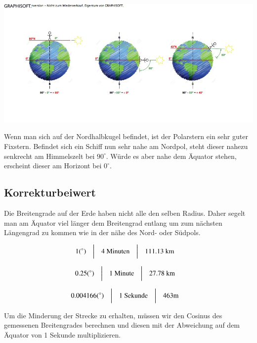 \begin{refsection}
\begin{center}
        \includegraphics[width=1\textwidth]{kugel/1Breitengrad.jpg}
\end{center}

Wenn man sich auf der Nordhalbkugel befindet, ist der Polarstern ein sehr guter Fixstern. Befindet sich ein Schiff nun sehr nahe am Nordpol, steht dieser nahezu senkrecht am Himmelszelt bei $90^{\circ}$. Würde es aber nahe dem Äquator stehen, erscheint dieser am Horizont bei $0^{\circ}$.

\subsection{Korrekturbeiwert}
Die Breitengrade auf der Erde haben nicht alle den selben Radius. Daher segelt man am Äquator viel länger dem Breitengrad entlang um zum nächsten Längengrad zu kommen wie in der nähe des Nord- oder Südpols.

\[
\begin{aligned}
&\text{1} (^{\circ})
&
&\text{\bigg \vert}
&
&\text{4 Minuten}
&
&\text{\bigg \vert}
&
&\text{111.13 km}
\end{aligned}
\]

\[
\begin{aligned}
&\text{0.25} (^{\circ})
&
&\text{\bigg \vert}
&
&\text{1 Minute}
&
&\text{\bigg \vert}
&
&\text{27.78 km}
\end{aligned}
\]

\[
\begin{aligned}
&\text{0.004166} (^{\circ})
&
&\text{\bigg \vert}
&
&\text{1 Sekunde}
&
&\text{\bigg \vert}
&
&\text{463m}
\end{aligned}
\]

Um die Minderung der Strecke zu erhalten, müssen wir den Cosinus des gemessenen Breitengrades berechnen und diesen mit der Abweichung auf dem Äquator von 1 Sekunde multiplizieren.


\end{refsection}
